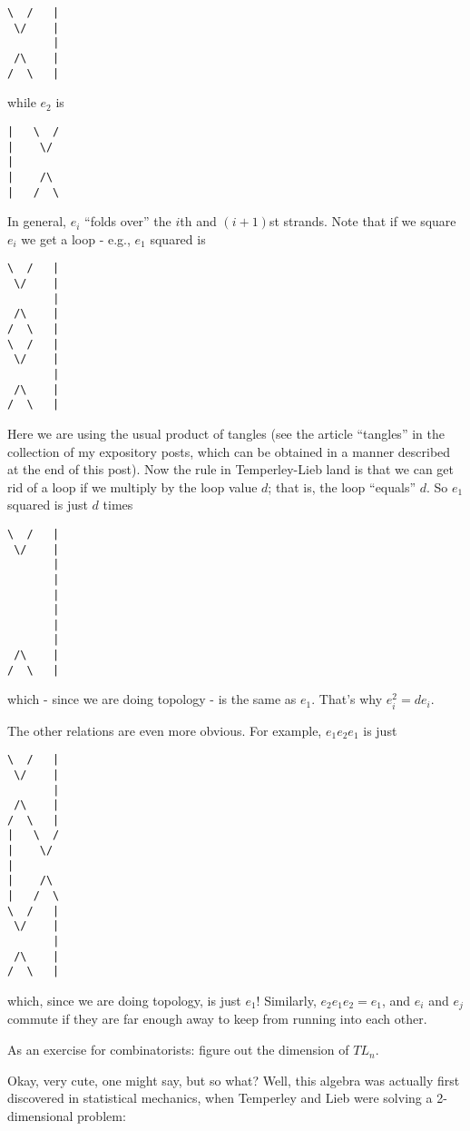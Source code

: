 \documentclass{article}
\begin{document}
\begin{verbatim}
\  /   |
 \/    |
       |
 /\    |
/  \   |
\end{verbatim}

while \(e_2\) is

\begin{verbatim}
|   \  /  
|    \/   
|      
|    /\   
|   /  \  
\end{verbatim}

In general, \(e_i\) ``folds over'' the \(i\)th and \((i+1)\)st strands.
Note that if we square \(e_i\) we get a loop - e.g., \(e_1\) squared is

\begin{verbatim}
\  /   |
 \/    |
       |
 /\    |
/  \   |
\  /   |
 \/    |
       |
 /\    |
/  \   |
\end{verbatim}

Here we are using the usual product of tangles (see the article
``tangles'' in the collection of my expository posts, which can be
obtained in a manner described at the end of this post). Now the rule in
Temperley-Lieb land is that we can get rid of a loop if we multiply by
the loop value \(d\); that is, the loop ``equals'' \(d\). So \(e_1\)
squared is just \(d\) times

\begin{verbatim}
\  /   |
 \/    |
       |
       |
       |
       |
       |
       |
 /\    |
/  \   |
\end{verbatim}

which - since we are doing topology - is the same as \(e_1\). That's why
\(e_i^2 = de_i\).

The other relations are even more obvious. For example, \(e_1 e_2 e_1\)
is just

\begin{verbatim}
\  /   |
 \/    |
       |
 /\    |
/  \   |
|   \  /  
|    \/   
|      
|    /\   
|   /  \  
\  /   |
 \/    |
       |
 /\    |
/  \   |
\end{verbatim}

which, since we are doing topology, is just \(e_1\)! Similarly,
\(e_2 e_1 e_2 = e_1\), and \(e_i\) and \(e_j\) commute if they are far
enough away to keep from running into each other.

As an exercise for combinatorists: figure out the dimension of \(TL_n\).

Okay, very cute, one might say, but so what? Well, this algebra was
actually first discovered in statistical mechanics, when Temperley and
Lieb were solving a 2-dimensional problem:
\end{document}
